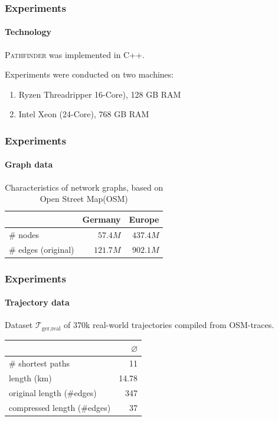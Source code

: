 \documentclass[10pt, t,
aspectratio=169,%
]{beamer}
\newcommand{\pathfinder}{\textsc{Pathfinder}\xspace}
\newcommand{\traj}[2]{\mathcal{T}_{\text{#1},\text{#2}}}
\begin{document}
\begin{frame}
	\frametitle{Experiments}
	\framesubtitle{Technology}
	\pathfinder was implemented in C++. \pause
	\medskip

	Experiments were conducted on two machines: \pause
	\begin{enumerate}
		\item Ryzen Threadripper 16-Core), 128 GB RAM
		\item Intel Xeon (24-Core), 768 GB RAM
	\end{enumerate}
\end{frame}

\begin{frame}
	\frametitle{Experiments}
	\framesubtitle{Graph data}
	\begin{table}
		{
			\caption{Characteristics of network graphs, based on Open Street Map(OSM)}
			\begin{tabular}{|l|rr|}
				\hline
				                    & Germany  & Europe
				\\ \hline
				\# nodes            & $57.4M$  & $437.4M$ \\
				\# edges (original) & $121.7M$ & $902.1M$ \\
				\hline
			\end{tabular}
		}
	\end{table}
\end{frame}

\begin{frame}
	\frametitle{Experiments}
	\framesubtitle{Trajectory data}
	Dataset $\traj{ger}{real}$ of 370k real-world trajectories compiled from OSM-traces.
	\begin{table}
		{
			\begin{tabular}{|l|r|}
				\hline
				                            & $\varnothing$ \\
				\hline
				\# shortest paths           & 11            \\
				length (km)                 & 14.78         \\
				original length (\#edges)   & 347           \\
				compressed length (\#edges) & 37            \\
				\hline
			\end{tabular}
		}
	\end{table}
\end{frame}
\end{document}
